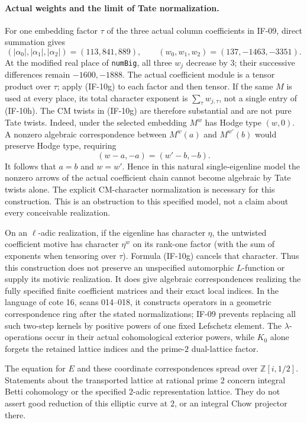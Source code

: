 \documentclass[11pt,a4paper]{article}
\theoremstyle{definition}
\theoremstyle{remark}
\begin{document}
\paragraph{Actual weights and the limit of Tate normalization.}
For one embedding factor $\tau$ of the three actual column coefficients
in IF-09, direct summation gives
\[
 (|\alpha_0|,|\alpha_1|,|\alpha_2|)=(113,841,889),
 \qquad (w_0,w_1,w_2)=(137,-1463,-3351).           \tag{IF-10h}
\]
At the modified real place of \texttt{numBig}, all three $w_j$ decrease
by $3$; their successive differences remain $-1600,-1888$.
The actual coefficient module is a tensor product over $\tau$; apply
(IF-10g) to each factor and then tensor. If the same $M$ is used at
every place, its total character exponent is $\sum_\tau w_{j,\tau}$,
not a single entry of (IF-10h). The CM twists in (IF-10g) are therefore
substantial and are not pure
Tate twists. Indeed, under the selected embedding $M^w$ has Hodge type
$(w,0)$. A nonzero algebraic correspondence between
$M^w(a)$ and $M^{w'}(b)$ would preserve Hodge type, requiring
\[
 (w-a,-a)=(w'-b,-b).
\]
It follows that $a=b$ and $w=w'$. Hence in this natural single-eigenline
model the nonzero arrows of the actual coefficient chain cannot become
algebraic by Tate twists alone. The explicit CM-character normalization
is necessary for this construction. This is an obstruction to this
specified model, not a claim about every conceivable realization.

On an $\ell$-adic realization, if the eigenline has character $\eta$,
the untwisted coefficient motive has character $\eta^w$ on its rank-one
factor (with the sum of exponents when tensoring over $\tau$). Formula
(IF-10g) cancels that character. Thus this construction
does not preserve an unspecified automorphic $L$-function or supply its
motivic realization. It does give algebraic correspondences realizing
the fully specified finite coefficient matrices and their exact local
indices. In the language of cote 16, scans 014--018, it constructs
operators in a geometric correspondence ring after the stated
normalizations; IF-09 prevents replacing all such two-step kernels by
positive powers of one fixed Lefschetz element. The $\lambda$-operations
occur in their actual cohomological exterior powers, while $K_0$ alone
forgets the retained lattice indices and the prime-$2$ dual-lattice
factor.

The equation for $E$ and these coordinate correspondences spread over
$\mathbb Z[i,1/2]$. Statements about the transported lattice at rational
prime $2$ concern integral Betti cohomology or the specified $2$-adic
representation lattice. They do not assert good reduction of this
elliptic curve at $2$, or an integral Chow projector there.
\end{document}
